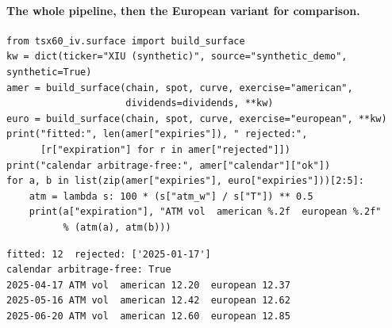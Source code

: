 \paragraph{The whole pipeline, then the European variant for comparison.}
{\footnotesize
\begin{verbatim}
from tsx60_iv.surface import build_surface
kw = dict(ticker="XIU (synthetic)", source="synthetic_demo", synthetic=True)
amer = build_surface(chain, spot, curve, exercise="american",
                     dividends=dividends, **kw)
euro = build_surface(chain, spot, curve, exercise="european", **kw)
print("fitted:", len(amer["expiries"]), " rejected:",
      [r["expiration"] for r in amer["rejected"]])
print("calendar arbitrage-free:", amer["calendar"]["ok"])
for a, b in list(zip(amer["expiries"], euro["expiries"]))[2:5]:
    atm = lambda s: 100 * (s["atm_w"] / s["T"]) ** 0.5
    print(a["expiration"], "ATM vol  american %.2f  european %.2f"
          % (atm(a), atm(b)))
\end{verbatim}
\vspace{-0.6em}
\begin{verbatim}
fitted: 12  rejected: ['2025-01-17']
calendar arbitrage-free: True
2025-04-17 ATM vol  american 12.20  european 12.37
2025-05-16 ATM vol  american 12.42  european 12.62
2025-06-20 ATM vol  american 12.60  european 12.85
\end{verbatim}
}
